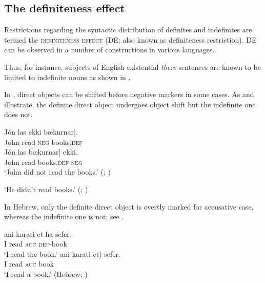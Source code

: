 \documentclass[output=paper,
colorlinks,
citecolor=brown,
newtxmath
]{langscibook}
\begin{document}
\subsection{The definiteness effect}

Restrictions regarding the syntactic distribution of definites and indefinites are termed the \textsc{definiteness effect} (DE; also known as definiteness restriction). DE can be observed in a number of constructions in various languages.

Thus, for instance, subjects of English existential \textit{there}-sentences are known to be limited to indefinite nouns as shown in .

\ea \label{en}
\z\z

\noindent In , direct objects can be shifted before negative markers in some cases. As  and  illustrate, the definite direct object undergoes object shift but the indefinite one does not.

\ea\label{ice1}
    \ea
    \gll	Jón las ekki \minsp{[} bækurnar].\\
		John read \textsc{neg} {} books.\textsc{def}\\
    \ex
    \gll	Jón las \minsp{[} bækurnar] ekki.\\
		John read {} books.\textsc{def} \textsc{neg}\\
	\z
\glt	`John did not read the books.' \hfill (; \citealt[392]{Collins.Thrainsson1996}) \\
\z

\ea\label{ice2}
    \z
\glt `He didn't read books.' \hfill (; \citealt[24]{Ritter.Rosen2005})
\z

\noindent In Hebrew, only the definite direct object is overtly marked for accusative case, whereas the indefinite one is not; see .

\ea \label{heb}
\ea \gll ani karati et ha-sefer.\\
I read \textsc{acc} \textsc{def}-book\\
\glt `I read the book.'
\ex
\gll	ani karati \minsp{(*} et) sefer.\\
I read {} \textsc{acc} book\\
\glt	`I read a book.'
\hfill (Hebrew; \citealt[24]{Ritter.Rosen2005})
\z\z
\end{document}
